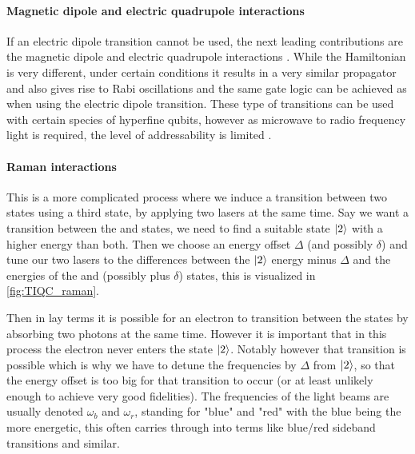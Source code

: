 \paragraph{Magnetic dipole and electric quadrupole interactions}
If an electric dipole transition cannot be used, the next leading contributions are the magnetic dipole and electric quadrupole interactions \cite{schaferFastGatesMixedSpecies2020}.
While the Hamiltonian is very different, under certain conditions it results in a very similar propagator and also gives rise to Rabi oscillations and the same gate logic can be achieved as when using the electric dipole transition.
These type of transitions can be used with certain species of hyperfine qubits, however as microwave to radio frequency light is required, the level of addressability is limited \cite{bruzewiczTrappedionQuantumComputing2019}.

\paragraph{Raman interactions}
This is a more complicated process where we induce a transition between two states using a third state, by applying two lasers at the same time.
Say we want a transition between the \kz and \ko states, we need to find a suitable state $\ket{2}$ with a higher energy than both.
Then we choose an energy offset $\Delta$ (and possibly $\delta$) and tune our two lasers to the differences between the $\ket{2}$ energy minus $\Delta$ and the energies of the \kz and \ko (possibly plus $\delta$) states, this is visualized in \cref{fig:TIQC_raman}.

Then in lay terms it is possible for an electron to transition between the states by absorbing two photons at the same time.
However it is important that in this process the electron never enters the state $\ket{2}$.
Notably however that transition is possible which is why we have to detune the frequencies by $\Delta$ from $\ket{2}$, so that the energy offset is too big for that transition to occur (or at least unlikely enough to achieve very good fidelities).
The frequencies of the light beams are usually denoted $\omega_b$ and $\omega_r$, standing for "blue" and "red" with the blue being the more energetic, this often carries through into terms like blue/red sideband transitions and similar.

